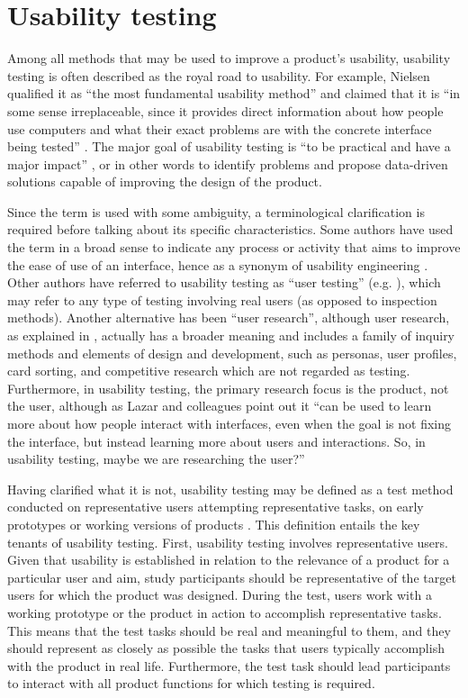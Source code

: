 \section{Usability testing}

Among all methods that may be used to improve a product’s usability, usability testing is often described as the royal road to usability. For example, Nielsen qualified it as ``the most fundamental usability method'' and claimed that it is ``in some sense irreplaceable, since it provides direct information about how people use computers and what their exact problems are with the concrete interface being tested'' \citep[165]{nielsen1993usability}. The major goal of usability testing is ``to be practical and have a major impact'' \citep[266]{lazar2017research}, or in other words to identify problems and propose data-driven solutions capable of improving the design of the product.

Since the term is used with some ambiguity, a terminological clarification is required before talking about its specific characteristics. Some authors have used the term in a broad sense to indicate any process or activity that aims to improve the ease of use of an interface, hence as a synonym of usability engineering \citep[267]{lazar2017research}. Other authors have referred to usability testing as ``user testing'' (e.g. \cite{nielsen1993usability}), which may refer to any type of testing involving real users (as opposed to inspection methods). Another alternative has been ``user research'', although user research, as explained in \citet{goodman2012observing}, actually has a broader meaning and includes a family of inquiry methods and elements of design and development, such as personas, user profiles, card sorting, and competitive research which are not regarded as testing. Furthermore, in usability testing, the primary research focus is the product, not the user, although as Lazar and colleagues point out it ``can be used to learn more about how people interact with interfaces, even when the goal is not fixing the interface, but instead learning more about users and interactions. So, in usability testing, maybe we are researching the user?'' \citep[263]{lazar2017research} 

Having clarified what it is not, usability testing may be defined as a test method conducted on representative users attempting representative tasks, on early prototypes or working versions of products \citep{lewis2012}. This definition entails the key tenants of usability testing. First, usability testing involves representative users. Given that usability is established in relation to the relevance of a product for a particular user and aim, study participants should be representative of the target users for which the product was designed. During the test, users work with a working prototype or the product in action to accomplish representative tasks. This means that the test tasks should be real and meaningful to them, and they should represent as closely as possible the tasks that users typically accomplish with the product in real life. Furthermore, the test task should lead participants to interact with all product functions for which testing is required.

